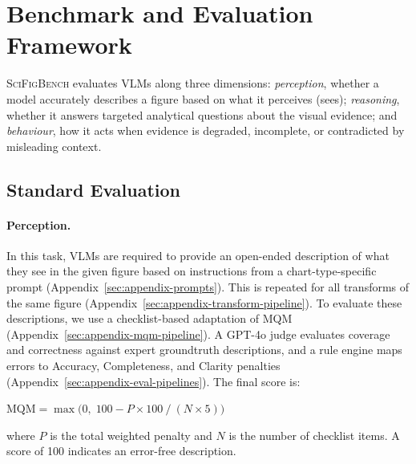 \section{Benchmark and Evaluation Framework}
\label{sec:framework}

\textsc{SciFigBench} evaluates VLMs along three dimensions: \emph{perception}, whether a model accurately describes a figure based on what it perceives (sees); \emph{reasoning}, whether it answers targeted analytical questions about the visual evidence; and \emph{behaviour}, how it acts when evidence is degraded, incomplete, or contradicted by misleading context. 



\subsection{Standard Evaluation}
\label{sec:mqm}

\paragraph{Perception.}
In this task, VLMs are required to provide an open-ended description of what they see in the given figure based on instructions from a chart-type-specific prompt (Appendix~\ref{sec:appendix-prompts}). This is repeated for all transforms of the same figure (Appendix~\ref{sec:appendix-transform-pipeline}). To evaluate these descriptions, we use a checklist-based adaptation of MQM (Appendix~\ref{sec:appendix-mqm-pipeline}). A GPT-4o judge evaluates coverage and correctness against expert groundtruth descriptions, and a rule engine maps errors to Accuracy, Completeness, and Clarity penalties (Appendix~\ref{sec:appendix-eval-pipelines}). The final score is:

\begin{tcolorbox}[colback=gray!5, colframe=gray!50, boxrule=0.4pt, arc=2pt, left=4pt, right=4pt, top=3pt, bottom=3pt]
\small
$\text{MQM} = \max\!\bigl(0,\; 100 - P \times 100 \mathbin{/} (N \times 5)\bigr)$

\smallskip
\noindent where $P$ is the total weighted penalty and $N$ is the number of checklist items. A score of 100 indicates an error-free description.
\end{tcolorbox}

